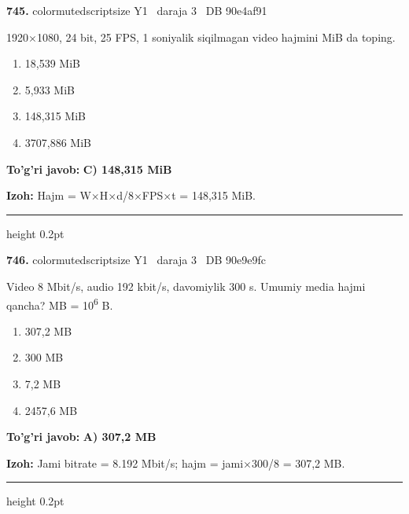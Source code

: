 \documentclass[10pt,a4paper,oneside]{article}
\begin{document}
\noindent\textbf{\color{ink}745.}  {color{muted}scriptsize Y1 \textbullet\ daraja 3 \textbullet\ DB 90e4af91}
\par
1920\ensuremath{\times}1080, 24 bit, 25 FPS, 1 soniyalik siqilmagan video hajmini MiB da toping.
\begin{enumerate}[label=\Alph*),leftmargin=9mm]
\item 18,539 MiB
\item 5,933 MiB
\item 148,315 MiB
\item 3707,886 MiB
\end{enumerate}
\begin{tcolorbox}[enhanced,breakable,colback=teal!4,colframe=teal!50!black,boxrule=0.5pt,arc=1.1mm,left=3mm,right=3mm,top=1.7mm,bottom=1.7mm,before skip=2mm,after skip=2mm]
\textbf{\color{teal}To'g'ri javob:} \textbf{C) 148,315 MiB}
\par\smallskip
\textbf{Izoh:} Hajm = W\ensuremath{\times}H\ensuremath{\times}d/8\ensuremath{\times}FPS\ensuremath{\times}t = 148,315 MiB.
\end{tcolorbox}
\vspace{2mm}\hrule height 0.2pt \vspace{3mm}

\noindent\textbf{\color{ink}746.}  {color{muted}scriptsize Y1 \textbullet\ daraja 3 \textbullet\ DB 90e9e9fc}
\par
Video 8 Mbit/s, audio 192 kbit/s, davomiylik 300 s. Umumiy media hajmi qancha? MB = 10\textsuperscript{6} B.
\begin{enumerate}[label=\Alph*),leftmargin=9mm]
\item 307,2 MB
\item 300 MB
\item 7,2 MB
\item 2457,6 MB
\end{enumerate}
\begin{tcolorbox}[enhanced,breakable,colback=teal!4,colframe=teal!50!black,boxrule=0.5pt,arc=1.1mm,left=3mm,right=3mm,top=1.7mm,bottom=1.7mm,before skip=2mm,after skip=2mm]
\textbf{\color{teal}To'g'ri javob:} \textbf{A) 307,2 MB}
\par\smallskip
\textbf{Izoh:} Jami bitrate = 8.192 Mbit/s; hajm = jami\ensuremath{\times}300/8 = 307,2 MB.
\end{tcolorbox}
\vspace{2mm}\hrule height 0.2pt \vspace{3mm}
\end{document}
